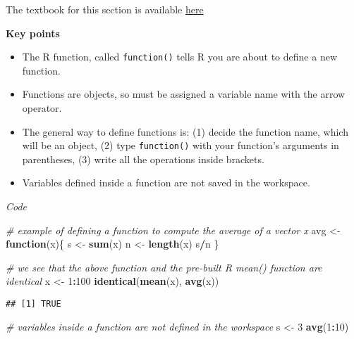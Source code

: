 \documentclass[]{article}
\newenvironment{Shaded}{\begin{snugshade}}{\end{snugshade}}
\newcommand{\CommentTok}[1]{\textcolor[rgb]{0.56,0.35,0.01}{\textit{#1}}}
\newcommand{\ControlFlowTok}[1]{\textcolor[rgb]{0.13,0.29,0.53}{\textbf{#1}}}
\newcommand{\DecValTok}[1]{\textcolor[rgb]{0.00,0.00,0.81}{#1}}
\newcommand{\KeywordTok}[1]{\textcolor[rgb]{0.13,0.29,0.53}{\textbf{#1}}}
\newcommand{\NormalTok}[1]{#1}
\newcommand{\OperatorTok}[1]{\textcolor[rgb]{0.81,0.36,0.00}{\textbf{#1}}}
\newcommand{\StringTok}[1]{\textcolor[rgb]{0.31,0.60,0.02}{#1}}
\providecommand{\tightlist}{%
  \setlength{\itemsep}{0pt}\setlength{\parskip}{0pt}}
\begin{document}
The textbook for this section is available
\href{https://rafalab.github.io/dsbook/programming-basics.html\#defining-functions}{here}

\textbf{Key points}

\begin{itemize}
\tightlist
\item
  The R function, called \texttt{function()} tells R you are about to
  define a new function.
\item
  Functions are objects, so must be assigned a variable name with the
  arrow operator.
\item
  The general way to define functions is: (1) decide the function name,
  which will be an object, (2) type \texttt{function()} with your
  function's arguments in parentheses, (3) write all the operations
  inside brackets.
\item
  Variables defined inside a function are not saved in the workspace.
\end{itemize}

\emph{Code}

\begin{Shaded}
\begin{Highlighting}[]
\CommentTok{# example of defining a function to compute the average of a vector x}
\NormalTok{avg <-}\StringTok{ }\ControlFlowTok{function}\NormalTok{(x)\{}
\NormalTok{  s <-}\StringTok{ }\KeywordTok{sum}\NormalTok{(x)}
\NormalTok{  n <-}\StringTok{ }\KeywordTok{length}\NormalTok{(x)}
\NormalTok{  s}\OperatorTok{/}\NormalTok{n}
\NormalTok{\}}

\CommentTok{# we see that the above function and the pre-built R mean() function are identical}
\NormalTok{x <-}\StringTok{ }\DecValTok{1}\OperatorTok{:}\DecValTok{100}
\KeywordTok{identical}\NormalTok{(}\KeywordTok{mean}\NormalTok{(x), }\KeywordTok{avg}\NormalTok{(x))}
\end{Highlighting}
\end{Shaded}

\begin{verbatim}
## [1] TRUE
\end{verbatim}

\begin{Shaded}
\begin{Highlighting}[]
\CommentTok{# variables inside a function are not defined in the workspace}
\NormalTok{s <-}\StringTok{ }\DecValTok{3}
\KeywordTok{avg}\NormalTok{(}\DecValTok{1}\OperatorTok{:}\DecValTok{10}\NormalTok{)}
\end{Highlighting}
\end{Shaded}
\end{document}
